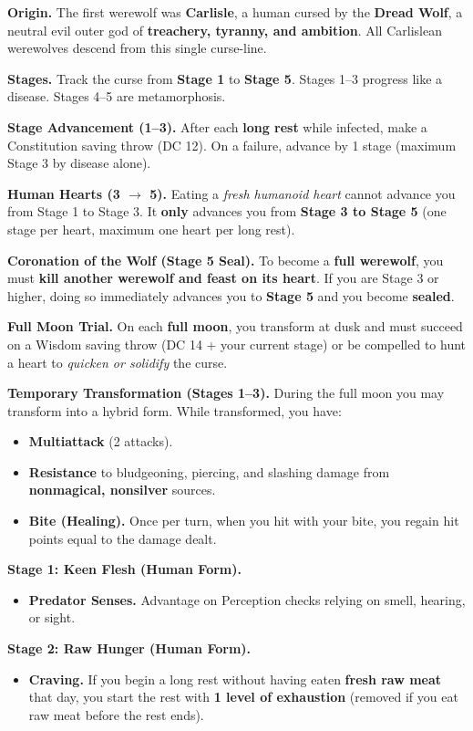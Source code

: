 \documentclass[letterpaper,twocolumn,openany,nodeprecatedcode,breakable,skins,xparse,most]{dndbook}
\begin{document}
\textbf{Origin.} The first werewolf was \textbf{Carlisle}, a human cursed by the \textbf{Dread Wolf}, a neutral evil outer god of \textbf{treachery, tyranny, and ambition}. All Carlislean werewolves descend from this single curse-line.

\textbf{Stages.} Track the curse from \textbf{Stage 1} to \textbf{Stage 5}. Stages 1--3 progress like a disease. Stages 4--5 are metamorphosis.

\textbf{Stage Advancement (1--3).} After each \textbf{long rest} while infected, make a Constitution saving throw (DC 12). On a failure, advance by 1 stage (maximum Stage 3 by disease alone).

\textbf{Human Hearts (3 $\rightarrow$ 5).} Eating a \emph{fresh humanoid heart} cannot advance you from Stage 1 to Stage 3. It \textbf{only} advances you from \textbf{Stage 3 to Stage 5} (one stage per heart, maximum one heart per long rest).

\textbf{Coronation of the Wolf (Stage 5 Seal).} To become a \textbf{full werewolf}, you must \textbf{kill another werewolf and feast on its heart}. If you are Stage 3 or higher, doing so immediately advances you to \textbf{Stage 5} and you become \textbf{sealed}.

\textbf{Full Moon Trial.} On each \textbf{full moon}, you transform at dusk and must succeed on a Wisdom saving throw (DC 14 + your current stage) or be compelled to hunt a heart to \emph{quicken or solidify} the curse. 

\textbf{Temporary Transformation (Stages 1--3).} During the full moon you may transform into a hybrid form. While transformed, you have:
\begin{itemize}
\item \textbf{Multiattack} (2 attacks).
\item \textbf{Resistance} to bludgeoning, piercing, and slashing damage from \textbf{nonmagical, nonsilver} sources.
\item \textbf{Bite (Healing).} Once per turn, when you hit with your bite, you regain hit points equal to the damage dealt.
\end{itemize}

\textbf{Stage 1: Keen Flesh (Human Form).}
\begin{itemize}
\item \textbf{Predator Senses.} Advantage on Perception checks relying on smell, hearing, or sight.
\end{itemize}

\textbf{Stage 2: Raw Hunger (Human Form).}
\begin{itemize}
\item \textbf{Craving.} If you begin a long rest without having eaten \textbf{fresh raw meat} that day, you start the rest with \textbf{1 level of exhaustion} (removed if you eat raw meat before the rest ends).
\end{itemize}
\end{document}
